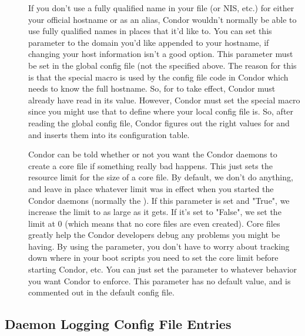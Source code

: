 \begin{description}
\item[] \label{param:DefaultDomainName}
  If you don't use a fully qualified name in your 
  file (or NIS, etc.) for either your official hostname or as an
  alias, Condor wouldn't normally be able to use fully qualified names
  in places that it'd like to.  You can set this parameter to the
  domain you'd like appended to your hostname, if changing your host
  information isn't a good option.  This parameter must be set in the
  global config file (not the  specified
  above.  The reason for this is that the 
  special macro is used by the config file code in Condor which needs
  to know the full hostname.  So, for  to
  take effect, Condor must already have read in its value.  However,
  Condor must set the  special macro since you
  might use that to define where your local config file is.  So, after
  reading the global config file, Condor figures out the right values
  for  and  and inserts them
  into its configuration table.

\item[] \label{param:CreateCoreFiles}
  Condor can be told whether or not you want the Condor daemons to
  create a core file if something really bad happens.  This just sets
  the resource limit for the size of a core file.  By default, we
  don't do anything, and leave in place whatever limit was in effect
  when you started the Condor daemons (normally the ).
  If this parameter is set and "True", we increase the limit to as
  large as it gets.  If it's set to "False", we set the limit at 0
  (which means that no core files are even created).  Core files
  greatly help the Condor developers debug any problems you might be
  having.  By using the parameter, you don't have to worry about
  tracking down where in your boot scripts you need to set the core
  limit before starting Condor, etc.  You can just set the parameter
  to whatever behavior you want Condor to enforce.  This parameter has
  no default value, and is commented out in the default config file. 

\end{description}


\subsection{Daemon Logging Config File Entries}
\label{sec:Daemon-Logging-Config-File-Entries}

